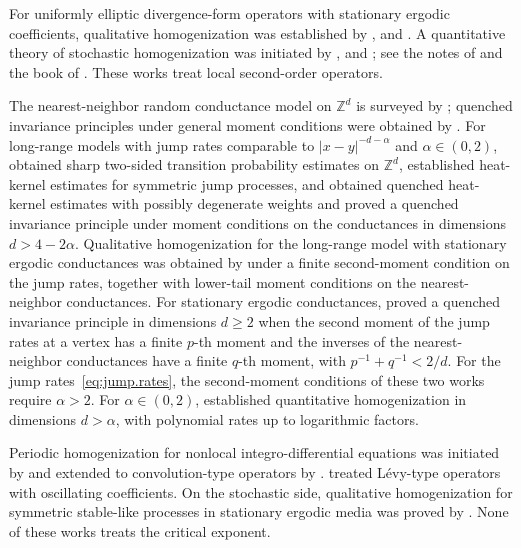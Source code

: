 \documentclass[11pt]{amsart}
\numberwithin{equation}{section}
\newcommand{\Z}{\mathbb{Z}}
\begin{document}
For uniformly elliptic divergence-form operators with stationary ergodic coefficients, qualitative homogenization was established by \citet{Kozlov1979}, \citet{PapanicolaouVaradhan1981} and \citet{Yurinskii1980}.
A quantitative theory of stochastic homogenization was initiated by \citet{GO1,GO2}, \citet*{GloriaNeukammOtto2015} and \citet{ArmstrongSmart2016}; see the notes of \citet{ArmstrongKuusi2022} and the book of \citet*{AKM2019}.
These works treat local second-order operators.

The nearest-neighbor random conductance model on $\Z^d$ is surveyed by \citet{Biskup2011}; quenched invariance principles under general moment conditions were obtained by \citet*{AndresDeuschelSlowik2015}.
For long-range models with jump rates comparable to $|x-y|^{-d-\alpha}$ and $\alpha \in (0,2)$, \citet{BassLevin2002} obtained sharp two-sided transition probability estimates on $\Z^d$, \citet{ChenKumagai2008} established heat-kernel estimates for symmetric jump processes, and \citet*{ChenKumagaiWang2020, CKW2021} obtained quenched heat-kernel estimates with possibly degenerate weights and proved a quenched invariance principle under moment conditions on the conductances in dimensions $d > 4 - 2\alpha$.
Qualitative homogenization for the long-range model with stationary ergodic conductances was obtained by \citet*{FlegelHeidaSlowik2019} under a finite second-moment condition on the jump rates, together with lower-tail moment conditions on the nearest-neighbor conductances.
For stationary ergodic conductances, \citet*{BCKW2021} proved a quenched invariance principle in dimensions $d \geq 2$ when the second moment of the jump rates at a vertex has a finite $p$-th moment and the inverses of the nearest-neighbor conductances have a finite $q$-th moment, with $p^{-1} + q^{-1} < 2/d$.
For the jump rates~\eqref{eq:jump.rates}, the second-moment conditions of these two works require $\alpha > 2$.
For $\alpha \in (0,2)$, \citet*{CCKW2025} established quantitative homogenization in dimensions $d > \alpha$, with polynomial rates up to logarithmic factors.

Periodic homogenization for nonlocal integro-differential equations was initiated by \citet{Schwab2010} and extended to convolution-type operators by \citet{PiatnitskiZhizhina2017}.
\citet*{KassmannPiatnitskiZhizhina2019} treated L\'evy-type operators with oscillating coefficients.
On the stochastic side, qualitative homogenization for symmetric stable-like processes in stationary ergodic media was proved by \citet*{ChenChenKumagaiWang2021SIAM}.
None of these works treats the critical exponent.
\end{document}
